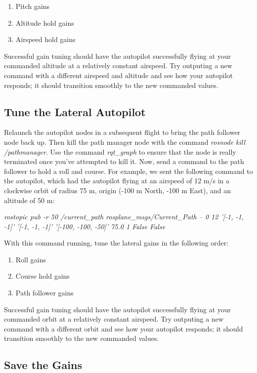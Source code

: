 \documentclass[]{auvsi_doc}
\begin{document}
\begin{enumerate}
	\item Pitch gains
	\item Altitude hold gains
	\item Airspeed hold gains
\end{enumerate}

Successful gain tuning should have the autopilot successfully flying at your commanded altitude at a relatively constant airspeed. Try outputing a new command with a different airspeed and altitude and see how your autopilot responds; it should transition smoothly to the new commanded values.

\subsection{Tune the Lateral Autopilot}

Relaunch the autopilot nodes in a subsequent flight to bring the path follower node back up. Then kill the path manager node with the command \textit{rosnode kill /pathmanager}. Use the command \textit{rqt\_graph} to ensure that the node is really terminated once you've attempted to kill it. Now, send a command to the path follower to hold a roll and course. For example, we sent the following command to the autopilot, which had the autopilot flying at an airspeed of 12 m/s in a clockwise orbit of radius 75 m, origin (-100 m North, -100 m East), and an altitude of 50 m:

\textit{rostopic pub -r 50 /current\_path rosplane\_msgs/Current\_Path -- 0 12 '[-1, -1, -1]' '[-1, -1, -1]' '[-100, -100, -50]' 75.0 1 False False}

With this command running, tune the lateral gains in the following order:

\begin{enumerate}
	\item Roll gains
	\item Course hold gains
	\item Path follower gains
\end{enumerate}

Successful gain tuning should have the autopilot successfully flying at your commanded orbit at a relatively constant airspeed. Try outputing a new command with a different orbit and see how your autopilot responds; it should transition smoothly to the new commanded values.

\subsection{Save the Gains}
\end{document}
